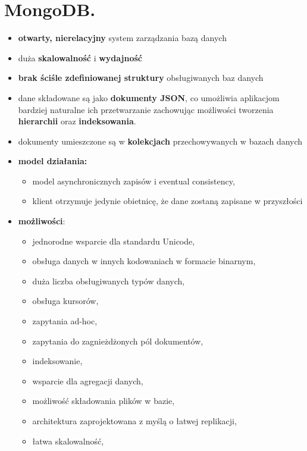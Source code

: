 \documentclass[a4paper]{article}
\begin{document}
    \section{MongoDB.}
    \begin{itemize}[noitemsep]
        \item \textbf{otwarty, nierelacyjny} system zarządzania bazą danych
        \item duża \textbf{skalowalność} i \textbf{wydajność}
        \item \textbf{brak ściśle zdefiniowanej struktury} obsługiwanych baz danych
        \item dane składowane są jako \textbf{dokumenty JSON}, co umożliwia aplikacjom bardziej naturalne ich
        przetwarzanie zachowując możliwości tworzenia \textbf{hierarchii} oraz \textbf{indeksowania}.
        \item dokumenty umieszczone są w \textbf{kolekcjach} przechowywanych w bazach danych
        \item \textbf{model działania:}
        \begin{itemize}[noitemsep]
            \item model asynchronicznych zapisów i eventual consistency,
            \item klient otrzymuje jedynie obietnicę, że dane zostaną zapisane w przyszłości
        \end{itemize}
        \item \textbf{możliwości}:
        \begin{itemize}[noitemsep]
            \item jednorodne wsparcie dla standardu Unicode,
            \item obsługa danych w innych kodowaniach w formacie binarnym,
            \item duża liczba obsługiwanych typów danych,
            \item obsługa kursorów,
            \item zapytania ad-hoc,
            \item zapytania do zagnieżdżonych pól dokumentów,
            \item indeksowanie,
            \item wsparcie dla agregacji danych,
            \item możliwość składowania plików w bazie,
            \item architektura zaprojektowana z myślą o łatwej replikacji,
            \item łatwa skalowalność,

\end{itemize}
\end{itemize}
\end{document}
